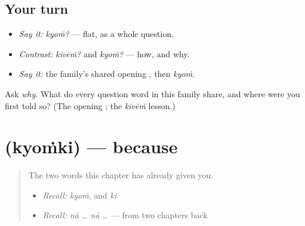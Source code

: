 \subsection*{Your turn}
\begin{itemize}
\raggedright
  \item \emph{Say it:} \emph{kyoṁ?} — flat, as a whole question.
  \item \emph{Contrast:} \emph{kivēṁ?} and \emph{kyoṁ?} — how, and why.
  \item \emph{Say it:} the family's shared opening \textbf{}, then \emph{kyoṁ}.
\end{itemize}

\begin{tcolorbox}[breakable,colback=teal!4,colframe=teal!35!black,title={Before you move on}]
Ask \emph{why}. What do every question word in this family share, and where were you first told so? (The opening \textbf{}; the \emph{kivēṁ} lesson.)
\end{tcolorbox}
\section[\texorpdfstring{\pa{ਕਿਉਂਕਿ} (kyoṁki)}{ਕਿਉਂਕਿ (kyoṁki)}]{ (kyoṁki) — because}

\label{lesson:PA-C40-kyunki}



\begin{quote}
The two words this chapter has already given you.

\begin{itemize}
\raggedright
  \item \emph{Recall:} \emph{kyoṁ}, and \emph{ki}
  \item \emph{Recall:} \emph{nā … nā …} — from two chapters back
\end{itemize}
\end{quote}


